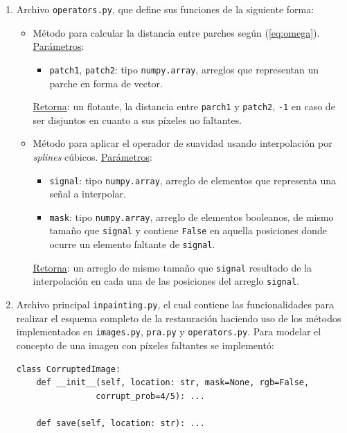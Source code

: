 \begin{enumerate}
	\item Archivo \texttt{operators.py}, que define sus funciones de la siguiente forma:
	\begin{itemize}
		\item {}
		
		M\'etodo para calcular la distancia entre parches seg\'un (\ref{eq:omega}). \underline{Par\'ametros}:
		\begin{itemize}
			\item \texttt{patch1}, \texttt{patch2}: tipo \texttt{numpy.array}, arreglos que representan un parche en forma de vector.
		\end{itemize}
		\underline{Retorna}: un flotante, la distancia entre \texttt{parch1} y \texttt{patch2}, \texttt{-1} en caso de ser disjuntos en cuanto a sus p\'ixeles no faltantes.
		
		\item {}
		
		M\'etodo para aplicar el operador de suavidad usando interpolaci\'on por \textit{splines} c\'ubicos. \underline{Par\'ametros}:
		\begin{itemize}
			\item \texttt{signal}: tipo \texttt{numpy.array}, arreglo de elementos que representa una señal a interpolar.
			\item \texttt{mask}: tipo \texttt{numpy.array}, arreglo de elementos booleanos, de mismo tamaño que \texttt{signal} y contiene \texttt{False} en aquella posiciones donde ocurre un elemento faltante de \texttt{signal}.
		\end{itemize}
		\underline{Retorna}: un arreglo de mismo tamaño que \texttt{signal} resultado de la interpolaci\'on en cada una de las posiciones del arreglo \texttt{signal}.
	\end{itemize}
	
	\item Archivo principal \texttt{inpainting.py}, el cual contiene las funcionalidades para realizar el esquema completo de la restauraci\'on haciendo uso de los m\'etodos implementados en \texttt{images.py},  \texttt{pra.py} y \texttt{operators.py}.
	Para modelar el concepto de una imagen con p\'ixeles faltantes se implement\'o:
	\begin{lstlisting}
class CorruptedImage:
	def __init__(self, location: str, mask=None, rgb=False, 
				corrupt_prob=4/5): ...
	
	def save(self, location: str): ...
	

\end{lstlisting}
\end{enumerate}

